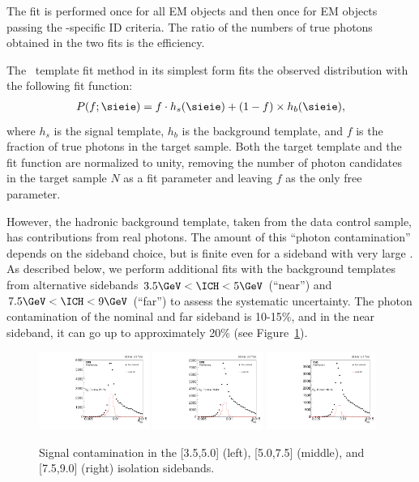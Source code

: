 The fit is performed once for all EM objects and then once for EM objects passing the \Pgg-specific ID criteria. 
The ratio of the numbers of true photons obtained in the two fits is the efficiency.

The \sieie\ template fit method in its simplest form fits the observed distribution with the following fit function:
\begin{align}
  P(f;\sieie) = f \cdot h_{s}(\sieie) + (1 - f) \times h_{b}(\sieie),
\end{align}
where $h_{s}$ is the signal template, $h_{b}$ is the background template, and $f$ is the fraction of true photons in the target sample. 
Both the target template and the fit function are normalized to unity, removing the number of photon candidates in the target sample $N$ as a fit parameter and leaving $f$ as the only free parameter.

However, the hadronic background template, taken from the data control sample, has contributions from real photons. 
The amount of this ``photon contamination'' depends on the sideband choice, but is finite even for a sideband with very large \ICH. 
As described below, we perform additional fits with the background templates from alternative sidebands $3.5\GeV < \ICH < 5\GeV$ (``near'') and $7.5\GeV < \ICH < 9\GeV$ (``far'') to assess the systematic uncertainty. 
The photon contamination of the nominal and far sideband is 10-15\%, and in the near sideband, it can go up to approximately 20\% (see Figure~\ref{fig:impurity-signal-contamination}).

\begin{figure}[htbp]
  \centering
  \includegraphics[width=0.32\textwidth]{Calibration/Figures/pvsf/sbcontam_near.pdf}
  \includegraphics[width=0.32\textwidth]{Calibration/Figures/pvsf/sbcontam_nominal.pdf}
  \includegraphics[width=0.32\textwidth]{Calibration/Figures/pvsf/sbcontam_far.pdf}
  \caption{
    Signal contamination in the [3.5,5.0] (left), [5.0,7.5] (middle), and [7.5,9.0] (right) isolation sidebands.
  }
  \label{fig:impurity-signal-contamination}
\end{figure}

